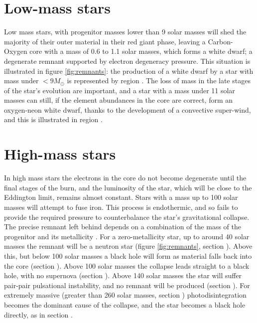 \begin{figure*}
  \centering
  
  \caption{The remnants left by a variety of masses and metallicities.}
  \label{fig:remnants}
\end{figure*}

\section{Low-mass stars}
\label{sec:low-mass-stars}

Low mass stars, with progenitor masses lower than 9 solar masses will
shed the majority of their outer material in their red giant phase,
leaving a Carbon-Oxygen core with a mass of 0.6 to 1.1 solar masses,
which forms a white dwarf; a degenerate remnant supported by electron
degeneracy pressure. This situation is illustrated in figure
\ref{fig:remnants}: the production of a white dwarf by a star with
mass under $<9 M_\odot$ is represented by region . The loss
of mass in the late stages of the star's evolution are important, and
a star with a mass under 11 solar masses can still, if the element
abundances in the core are correct, form an oxygen-neon white dwarf,
thanks to the development of a convective super-wind, and this is
illustrated in region .

\section{High-mass stars}
\label{sec:high-mass-stars}

In high mass stars the electrons in the core do not become degenerate
until the final stages of the burn, and the luminosity of the star,
which will be close to the Eddington limit, remains almost
constant. Stars with a mass up to 100 solar masses will attempt to
fuse iron. This process is endothermic, and so fails to provide the
required pressure to counterbalance the star's gravitational collapse.
The precise remnant left behind depends on a combination of the mass
of the progenitor and its metallicity \cite{2003ApJ...591..288H}.  For
a zero-metallicity star, up to around 40 solar masses the remnant will
be a neutron star (figure \ref{fig:remnants}, section
). Above this, but below 100 solar masses a black hole will
form as material falls back into the core (section ). Above
100 solar masses the collapse leads straight to a black hole, with no
supernova (section ). Above 140 solar masses the star will
suffer pair-pair pulsational instability, and no remnant will be
produced (section ). For extremely massive (greater than
260 solar masses, section ) photodisintegration becomes the
dominant cause of the collapse, and the star becomes a black hole
directly, as in section .

